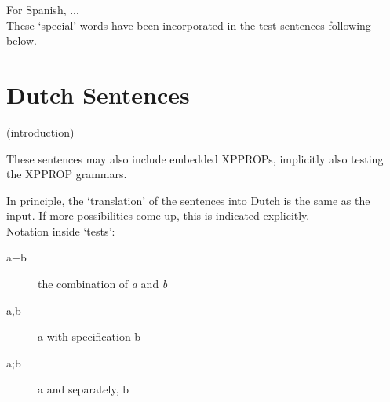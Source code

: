 For Spanish, ...
\\[2 ex]
These `special' words have been incorporated in the test sentences following 
below.


\newpage

\section{Dutch Sentences}
(introduction)

These sentences may also include embedded XPPROPs, implicitly also testing the 
XPPROP grammars.

In principle, the `translation' of the sentences into Dutch is the same as the 
input. If more possibilities come up, this is indicated explicitly.
\\[2 ex]
Notation inside `tests':

\begin{description}
\item[a+b] the combination of {\em a} and {\em b}
\item[a,b] a with specification b
\item[a;b] a and separately, b
\end{description}

